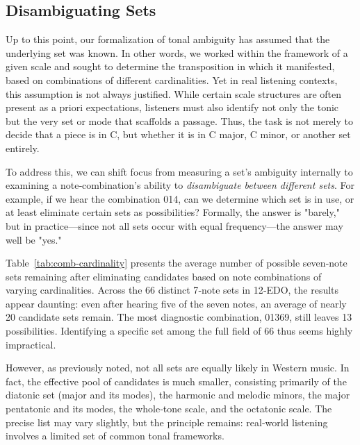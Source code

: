 \documentclass[10pt,twocolumn]{article}
\numberwithin{equation}{section} %
\begin{document}
    \subsection{Disambiguating Sets}

    Up to this point, our formalization of tonal ambiguity has assumed that the underlying set was known.
    In other words, we worked within the framework of a given scale and sought to determine the transposition in which it manifested, based on combinations of different cardinalities.
    Yet in real listening contexts, this assumption is not always justified.
    While certain scale structures are often present as a priori expectations\citep{Krumhansl1979}, listeners must also identify not only the tonic but the very set or mode that scaffolds a passage.
    Thus, the task is not merely to decide that a piece is in C, but whether it is in C major, C minor, or another set entirely.

    To address this, we can shift focus from measuring a set's ambiguity internally to examining a note‑combination's ability to \textit{disambiguate between different sets}.
    For example, if we hear the combination 014, can we determine which set is in use, or at least eliminate certain sets as possibilities?
    Formally, the answer is "barely," but in practice—since not all sets occur with equal frequency—the answer may well be "yes."

    Table~\ref{tab:comb-cardinality} presents the average number of possible seven‑note sets remaining after eliminating candidates based on note combinations of varying cardinalities.
    Across the 66 distinct 7‑note sets in 12‑EDO, the results appear daunting: even after hearing five of the seven notes, an average of nearly 20 candidate sets remain.
    The most diagnostic combination, 01369, still leaves 13 possibilities.
    Identifying a specific set among the full field of 66 thus seems highly impractical.

    

    However, as previously noted, not all sets are equally likely in Western music.
    In fact, the effective pool of candidates is much smaller, consisting primarily of the diatonic set (major and its modes), the harmonic and melodic minors, the major pentatonic and its modes, the whole‑tone scale, and the octatonic scale.
    The precise list may vary slightly, but the principle remains: real‑world listening involves a limited set of common tonal frameworks.
\end{document}
